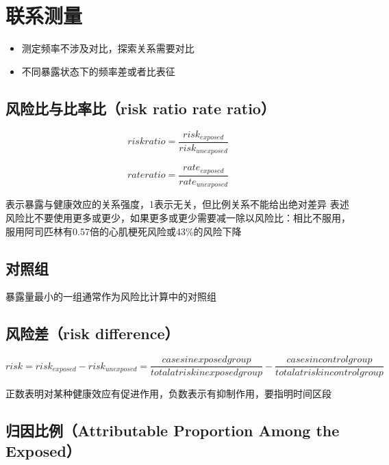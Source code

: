 \documentclass[
]{book}
\providecommand{\tightlist}{%
  \setlength{\itemsep}{0pt}\setlength{\parskip}{0pt}}
\begin{document}
\hypertarget{ux8054ux7cfbux6d4bux91cf}{%
\section{联系测量}\label{ux8054ux7cfbux6d4bux91cf}}

\begin{itemize}
\tightlist
\item
  测定频率不涉及对比，探索关系需要对比
\item
  不同暴露状态下的频率差或者比表征
\end{itemize}

\hypertarget{ux98ceux9669ux6bd4ux4e0eux6bd4ux7387ux6bd4risk-ratio-rate-ratio}{%
\subsection{风险比与比率比（risk ratio rate ratio）}\label{ux98ceux9669ux6bd4ux4e0eux6bd4ux7387ux6bd4risk-ratio-rate-ratio}}

\[risk ratio = \frac{risk_{exposed}}{risk_{unexposed}}\]

\[rate ratio = \frac{rate_{exposed}}{rate_{unexposed}}\]

表示暴露与健康效应的关系强度，1表示无关，但比例关系不能给出绝对差异
表述风险比不要使用更多或更少，如果更多或更少需要减一除以风险比：相比不服用，服用阿司匹林有0.57倍的心肌梗死风险或43\%的风险下降

\hypertarget{ux5bf9ux7167ux7ec4}{%
\subsection{对照组}\label{ux5bf9ux7167ux7ec4}}

暴露量最小的一组通常作为风险比计算中的对照组

\hypertarget{ux98ceux9669ux5deerisk-difference}{%
\subsection{风险差（risk difference）}\label{ux98ceux9669ux5deerisk-difference}}

\[risk = risk_{exposed} - risk_{unexposed} = \frac{cases in exposed group}{total at risk in exposed group} - \frac{cases in control group}{total at risk in control group}\]

正数表明对某种健康效应有促进作用，负数表示有抑制作用，要指明时间区段

\hypertarget{ux5f52ux56e0ux6bd4ux4f8battributable-proportion-among-the-exposed}{%
\subsection{归因比例（Attributable Proportion Among the Exposed）}\label{ux5f52ux56e0ux6bd4ux4f8battributable-proportion-among-the-exposed}}
\end{document}
